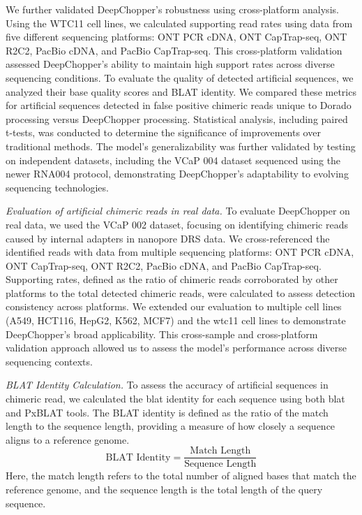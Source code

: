 \documentclass[pdflatex, sn-mathphys-num, lineno]{sn-jnl}%
\theoremstyle{thmstyleone}%
\theoremstyle{thmstyletwo}%
\theoremstyle{thmstylethree}%
\begin{document}
We further validated DeepChopper's robustness using cross-platform analysis.
Using the WTC11 cell lines, we calculated supporting read rates using data from five different sequencing platforms: ONT PCR cDNA, ONT CapTrap-seq, ONT R2C2, PacBio cDNA, and PacBio CapTrap-seq.
This cross-platform validation assessed DeepChopper's ability to maintain high support rates across diverse sequencing conditions.
To evaluate the quality of detected artificial sequences, we analyzed their base quality scores and BLAT identity.
We compared these metrics for artificial sequences detected in false positive chimeric reads unique to Dorado processing versus DeepChopper processing.
Statistical analysis, including paired t-tests, was conducted to determine the significance of improvements over traditional methods.
The model's generalizability was further validated by testing on independent datasets, including the VCaP 004 dataset sequenced using the newer RNA004 protocol, demonstrating DeepChopper's adaptability to evolving sequencing technologies.

\textit{Evaluation of artificial chimeric reads in real data.} To evaluate DeepChopper on real data, we used the VCaP 002 dataset, focusing on identifying chimeric reads caused by internal adapters in nanopore DRS data.
We cross-referenced the identified reads with data from multiple sequencing platforms: ONT PCR cDNA, ONT CapTrap-seq, ONT R2C2, PacBio cDNA, and PacBio CapTrap-seq.
Supporting rates, defined as the ratio of chimeric reads corroborated by other platforms to the total detected chimeric reads, were calculated to assess detection consistency across platforms.
We extended our evaluation to multiple cell lines (A549, HCT116, HepG2, K562, MCF7) and the wtc11 cell lines to demonstrate DeepChopper's broad applicability.
This cross-sample and cross-platform validation approach allowed us to assess the model's performance across diverse sequencing contexts.


\textit{BLAT Identity Calculation.} To assess the accuracy of artificial sequences in chimeric read, we calculated the \gls{blat} identity for each sequence using both \gls{blat} and PxBLAT tools.
The BLAT identity is defined as the ratio of the match length to the sequence length, providing a measure of how closely a sequence aligns to a reference genome.
\[
\textrm{BLAT Identity} = \frac{\textrm{Match Length}}{\textrm{Sequence Length}}
\]
Here, the match length refers to the total number of aligned bases that match the reference genome, and the sequence length is the total length of the query sequence.
\end{document}
